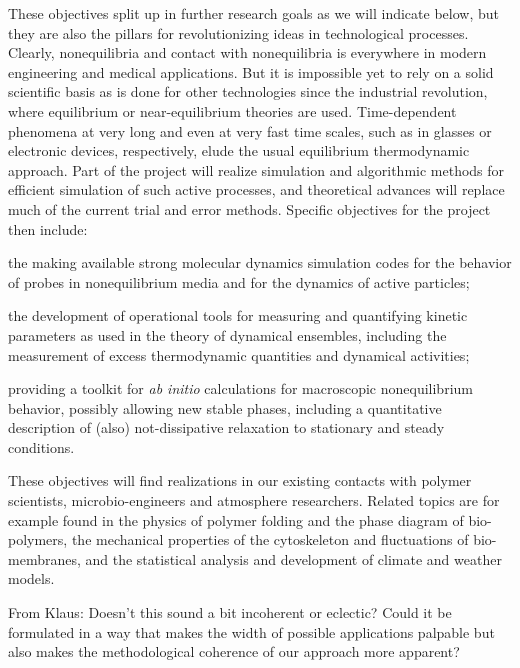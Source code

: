 These objectives split up in further research goals as we will indicate below, but they are
also the pillars for revolutionizing ideas in technological processes. Clearly,
nonequilibria and contact with nonequilibria is everywhere in modern engineering and medical
applications.
%
But it is impossible yet to rely on a solid scientific basis as is done for other
technologies since the industrial revolution, where equilibrium or near-equilibrium theories
are used.
%
Time-dependent phenomena at very long and even at very fast time scales, such as in glasses
or electronic devices, respectively, elude the usual equilibrium thermodynamic
approach. Part of the project will realize simulation and algorithmic methods for efficient
simulation of such active processes, and theoretical advances will replace much of the
current trial and error methods. Specific objectives for the project then include:
\begin{inparaenum}[A.]
\item the making available strong molecular dynamics simulation codes for the behavior of
  probes in nonequilibrium media and for the dynamics of active particles;
\item the development of operational tools for measuring and quantifying kinetic parameters
  as used in the theory of dynamical ensembles, including the measurement of excess
  thermodynamic quantities and dynamical activities;
\item providing a toolkit for {\it ab initio} calculations for macroscopic nonequilibrium
  behavior, possibly allowing new stable phases, including a quantitative description of
  (also) not-dissipative relaxation to stationary and steady conditions.
\end{inparaenum}
These objectives will find realizations in our existing contacts with polymer scientists,
microbio-engineers and atmosphere researchers. Related topics are for example found in the
physics of polymer folding and the phase diagram of bio-polymers, the mechanical properties
of the cytoskeleton and fluctuations of bio-membranes, and the statistical analysis and
development of climate and weather models.

\begin{draft}
  From Klaus: Doesn't this sound a bit incoherent or eclectic? Could it be formulated in a
  way that makes the width of possible applications palpable but also makes the
  methodological coherence of our approach more apparent?
\end{draft}

